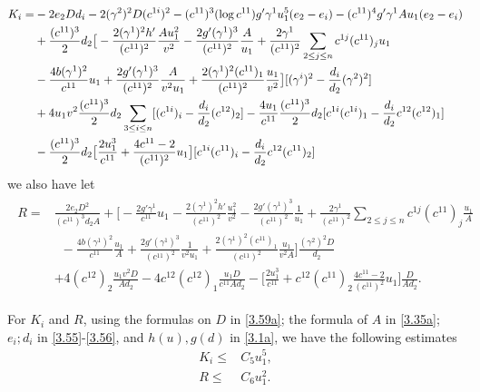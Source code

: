 \documentclass[11pt]{amsart}
\numberwithin{equation}{section}
\begin{document}
\begin{align}\label{3.64a}
K_i=&-2e_2Dd_{i}-2(\gamma^2)^2D(c^{1i})^2-(c^{11})^3(\log c^{11})g'\gamma^1u_1^5(e_2-e_i)-(c^{11})^4g'\gamma^1Au_1(e_2-e_i)\notag\\&
+\frac{(c^{11})^3}{2}d_2\big[-\frac{2(\gamma^1)^2h'}{(c^{11})^2}\frac{Au_1^2}{v^2}
-\frac{2g'(\gamma^1)^3}{(c^{11})^2}\frac{A}{u_1}
+\frac{2\gamma^1}{(c^{11})^2}\sum_{2\leq j\leq n}c^{1j}(c^{11})_ju_1\notag
\\&-\frac{4b(\gamma^1)^2}{c^{11}}u_1+\frac{2g'(\gamma^1)^3}{(c^{11})^2}\frac{A}{v^2u_1}
+\frac{2(\gamma^1)^2(c^{11})_1}{(c^{11})^2}\frac{u_1}{v^2}\big][(\gamma^i)^2-\frac{d_i}{d_2}(\gamma^2)^2]\notag\\&+4u_1v^2\frac{(c^{11})^3}{2}d_2\sum_{3\leq i\leq n}[(c^{1i})_{i}-\frac{d_i}{d_2}(c^{12})_{2}]-\frac{4u_1}{c^{11}}\frac{(c^{11})^3}{2}d_2 [c^{1i}(c^{1i})_1-\frac{d_i}{d_2}c^{12}(c^{12})_1]\notag\\&
-\frac{(c^{11})^3}{2}d_2\big[\frac{2u_1^3}{c^{11}}+\frac{4c^{11}-2}{(c^{11})^2}u_1\big][c^{1i}(c^{11})_i-\frac{d_i}{d_2}c^{12}(c^{11})_2]
\end{align}
we also have let
\begin{align*}
\begin{split}
R=&\frac{2e_2D^2}{(c^{11})^3d_2A}+\big[-\frac{2g'\gamma^1}{c^{11}}u_1-\frac{2(\gamma^1)^2h'}{(c^{11})^2}\frac{u_1^2}{v^2}
-\frac{2g'(\gamma^1)^3}{(c^{11})^2}\frac{1}{u_1}
+\frac{2\gamma^1}{(c^{11})^2}\sum_{2\leq j\leq n}c^{1j}(c^{11})_j\frac{u_1}{A}\\&\,\,\,-\frac{4b(\gamma^1)^2}{c^{11}}\frac{u_1}{A}+\frac{2g'(\gamma^1)^3}{(c^{11})^2}\frac{1}{v^2u_1}
+\frac{2(\gamma^1)^2(c^{11})_1}{(c^{11})^2}\frac{u_1}{v^2A}\big]\frac{(\gamma^2)^2D}{d_2}\\&
+4(c^{12})_{2}\frac{u_1v^2D}{Ad_2}-4c^{12}(c^{12})_1\frac{u_1D}{c^{11}Ad_2}-\big[\frac{2u_1^3}{c^{11}}
+c^{12}(c^{11})_2\frac{4c^{11}-2}{(c^{11})^2}u_1\big]\frac{D}{Ad_2}.
\end{split}
\end{align*}

For $K_i$ and $R$, using the formulas on $D$ in \eqref{3.59a}; the formula of $A$ in \eqref{3.35a}; $ e_i; d_i$  in \eqref{3.55}-\eqref{3.56}, and  $h(u), g(d)$ in \eqref{3.1a}, we have the following estimates
\begin{align}
K_i\leq& C_5u_1^5,\label{3.64b}\\
R\leq &C_6u_1^2.\label{3.64c}
\end{align}
\end{document}
